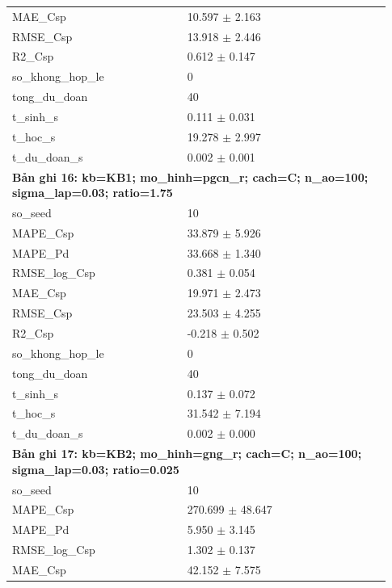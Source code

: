 \begin{longtable}{p{0.43\linewidth}p{0.50\linewidth}}
MAE\_\allowbreak Csp & 10.597 $\pm$ 2.163 \\
RMSE\_\allowbreak Csp & 13.918 $\pm$ 2.446 \\
R2\_\allowbreak Csp & 0.612 $\pm$ 0.147 \\
so\_\allowbreak khong\_\allowbreak hop\_\allowbreak le & 0 \\
tong\_\allowbreak du\_\allowbreak doan & 40 \\
t\_\allowbreak sinh\_\allowbreak s & 0.111 $\pm$ 0.031 \\
t\_\allowbreak hoc\_\allowbreak s & 19.278 $\pm$ 2.997 \\
t\_\allowbreak du\_\allowbreak doan\_\allowbreak s & 0.002 $\pm$ 0.001 \\
\midrule
\multicolumn{2}{p{0.95\linewidth}}{\textbf{Bản ghi 16: kb=KB1; mo\_hinh=pgcn\_r; cach=C; n\_ao=100; sigma\_lap=0.03; ratio=1.75}} \\
so\_\allowbreak seed & 10 \\
MAPE\_\allowbreak Csp & 33.879 $\pm$ 5.926 \\
MAPE\_\allowbreak Pd & 33.668 $\pm$ 1.340 \\
RMSE\_\allowbreak log\_\allowbreak Csp & 0.381 $\pm$ 0.054 \\
MAE\_\allowbreak Csp & 19.971 $\pm$ 2.473 \\
RMSE\_\allowbreak Csp & 23.503 $\pm$ 4.255 \\
R2\_\allowbreak Csp & -0.218 $\pm$ 0.502 \\
so\_\allowbreak khong\_\allowbreak hop\_\allowbreak le & 0 \\
tong\_\allowbreak du\_\allowbreak doan & 40 \\
t\_\allowbreak sinh\_\allowbreak s & 0.137 $\pm$ 0.072 \\
t\_\allowbreak hoc\_\allowbreak s & 31.542 $\pm$ 7.194 \\
t\_\allowbreak du\_\allowbreak doan\_\allowbreak s & 0.002 $\pm$ 0.000 \\
\midrule
\multicolumn{2}{p{0.95\linewidth}}{\textbf{Bản ghi 17: kb=KB2; mo\_hinh=gng\_r; cach=C; n\_ao=100; sigma\_lap=0.03; ratio=0.025}} \\
so\_\allowbreak seed & 10 \\
MAPE\_\allowbreak Csp & 270.699 $\pm$ 48.647 \\
MAPE\_\allowbreak Pd & 5.950 $\pm$ 3.145 \\
RMSE\_\allowbreak log\_\allowbreak Csp & 1.302 $\pm$ 0.137 \\
MAE\_\allowbreak Csp & 42.152 $\pm$ 7.575 \\

\end{longtable}
